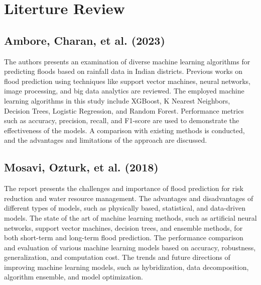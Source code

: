 \documentclass[a4paper,12pt]{report}
\begin{document}
\chapter{Literture Review}

\section{Ambore, Charan, et al. (2023)}
The authors presents an examination of diverse machine learning algorithms for predicting floods based on rainfall data in Indian districts. Previous works on flood prediction using techniques like support vector machines, neural networks, image processing, and big data analytics are reviewed. The employed machine learning algorithms in this study include XGBoost, K Nearest Neighbors, Decision Trees, Logistic Regression, and Random Forest. Performance metrics such as accuracy, precision, recall, and F1-score are used to demonstrate the effectiveness of the models. A comparison with existing methods is conducted, and the advantages and limitations of the approach are discussed.

\section{Mosavi, Ozturk, et al. (2018)}
The report presents the challenges and importance of flood prediction for risk reduction and water resource management. The advantages and disadvantages of different types of models, such as physically based, statistical, and data-driven models. The state of the art of machine learning methods, such as artificial neural networks, support vector machines, decision trees, and ensemble methods, for both short-term and long-term flood prediction. The performance comparison and evaluation of various machine learning models based on accuracy, robustness, generalization, and computation cost. The trends and future directions of improving machine learning models, such as hybridization, data decomposition, algorithm ensemble, and model optimization.
\end{document}
